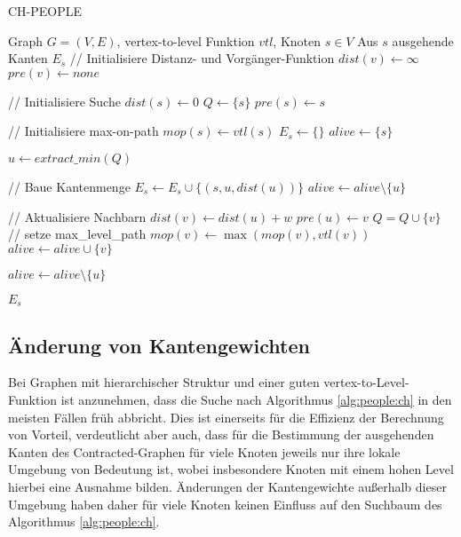 \begin{algorithm}[p]
  \caption{CH-PEOPLE}
  \begin{algorithmic}[1]
    \Require Graph $G = (V, E)$, vertex-to-level Funktion ${vtl}$, Knoten $s \in V$
    \Ensure Aus $s$ ausgehende Kanten $E_s$
    \State // Initialisiere Distanz- und Vorgänger-Funktion
    \State ${dist}(v) \leftarrow \infty$
    \State ${pre}(v) \leftarrow {none}$
    \EndFor

    \State
    \State // Initialisiere Suche
    \State ${dist}(s) \leftarrow 0$
    \State $Q\leftarrow \{ s \}$
    \State ${pre}(s) \leftarrow s$

    \State
    \State // Initialisiere max-on-path
    \State ${mop}(s) \leftarrow {vtl}(s)$
    \State $E_s \leftarrow \{ \}$
    \State ${alive} \leftarrow \{ s \}$

    \State
    \State $u \leftarrow{extract\_min}(Q)$\label{graphs:dijkstra:pop}

    \State
    \State // Baue Kantenmenge
    \State $E_s \leftarrow E_s \cup \{ (s, u, {dist}(u)) \}$
    \State ${alive} \leftarrow {alive} \setminus \{ u \}$
    \EndIf

    \State
    \State // Aktualisiere Nachbarn
    \State ${dist}(v) \leftarrow {dist}(u) + w$
    \State ${pre}(u) \leftarrow v$
    \State $Q = Q \cup \{ v \}$
    \State
    \State // setze max\_level\_path
    \State ${mop}(v) \leftarrow \max({mop}(v), {vtl}(v))$
    \State
    \State ${alive} \leftarrow {alive} \cup \{ v \}$
    \EndIf
    \EndIf
    \EndFor

    \State ${alive} \leftarrow {alive} \setminus \{ u \}$

    \EndWhile

    \State
    \State \Return $E_s$
  \end{algorithmic}
  \label{alg:people:ch}
\end{algorithm}

\subsection{Änderung von Kantengewichten}

Bei Graphen mit hierarchischer Struktur und einer guten vertex-to-Level-Funktion ist anzunehmen, dass die Suche nach Algorithmus \ref{alg:people:ch}  in den meisten Fällen früh abbricht.
Dies ist einerseits für die Effizienz der Berechnung von Vorteil, verdeutlicht aber auch, dass für die Bestimmung der ausgehenden Kanten des Contracted-Graphen für viele Knoten jeweils nur ihre lokale Umgebung von Bedeutung ist, wobei insbesondere Knoten mit einem hohen Level hierbei eine Ausnahme bilden.
Änderungen der Kantengewichte außerhalb dieser Umgebung haben daher für viele Knoten keinen Einfluss auf den Suchbaum des Algorithmus \ref{alg:people:ch}.

